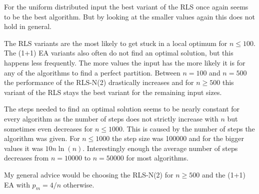 For the uniform distributed input the best variant of the RLS once again seems to be the best algorithm.
But by looking at the smaller values again this does not hold in general.



The RLS variants are the most likely to get stuck in a local optimum for $n\le100$. The (1+1) EA variants also often do not find an optimal solution, but this happens less frequently. The more values the input has the more likely it is for any of the algorithms to find a perfect partition. Between $n=100$ and $n=500$ the performance of the RLS-N(2) drastically increases and for $n\ge500$ this variant of the RLS stays the best variant for the remaining input sizes.



The steps needed to find an optimal solution seems to be nearly constant for every algorithm as the number of steps does not strictly increase with $n$ but sometimes even decreases for $n\le1000$.
This is caused by the number of steps the algorithm was given.
For $n\le1000$ the step size was 100000 and for the bigger values it was $10n\ln(n)$.
Interestingly enough the average number of steps decreases from $n=10000$ to $n=50000$ for most algorithms.



My general advice would be choosing the RLS-N(2) for $n\ge500$ and the (1+1) EA with $p_m=4/n$ otherwise.